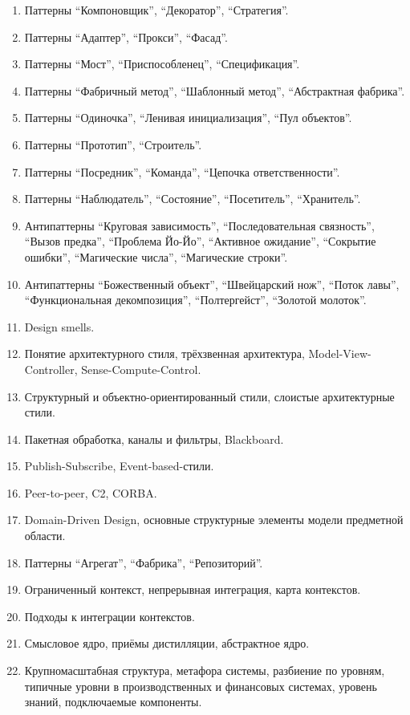 \documentclass[a5paper]{article}
\begin{document}
\begin{enumerate}
	\item Паттерны ``Компоновщик'', ``Декоратор'', ``Стратегия''.
	\item Паттерны ``Адаптер'', ``Прокси'', ``Фасад''.
	\item Паттерны ``Мост'', ``Приспособленец'', ``Спецификация''.
	\item Паттерны ``Фабричный метод'', ``Шаблонный метод'', ``Абстрактная фабрика''.
	\item Паттерны ``Одиночка'', ``Ленивая инициализация'', ``Пул объектов''.
	\item Паттерны ``Прототип'', ``Строитель''.
	\item Паттерны ``Посредник'', ``Команда'', ``Цепочка ответственности''.
	\item Паттерны ``Наблюдатель'', ``Состояние'', ``Посетитель'', ``Хранитель''.
	\item Антипаттерны ``Круговая зависимость'', ``Последовательная связность'', ``Вызов предка'', ``Проблема Йо-Йо'', ``Активное ожидание'', ``Сокрытие ошибки'', ``Магические числа'', ``Магические строки''.
	\item Антипаттерны ``Божественный объект'', ``Швейцарский нож'', ``Поток лавы'', ``Функциональная декомпозиция'', ``Полтергейст'', ``Золотой молоток''.
	\item Design smells.
	\item Понятие архитектурного стиля, трёхзвенная архитектура, Model-View-Controller, Sense-Compute-Control.
	\item Структурный и объектно-ориентированный стили, слоистые архитектурные стили.
	\item Пакетная обработка, каналы и фильтры, Blackboard.
	\item Publish-Subscribe, Event-based-стили.
	\item Peer-to-peer, C2, CORBA.
	\item Domain-Driven Design, основные структурные элементы модели предметной области.
	\item Паттерны ``Агрегат'', ``Фабрика'', ``Репозиторий''.
	\item Ограниченный контекст, непрерывная интеграция, карта контекстов.
	\item Подходы к интеграции контекстов.
	\item Смысловое ядро, приёмы дистилляции, абстрактное ядро.
	\item Крупномасштабная структура, метафора системы, разбиение по уровням, типичные уровни в производственных и финансовых системах, уровень знаний, подключаемые компоненты.

\end{enumerate}
\end{document}
